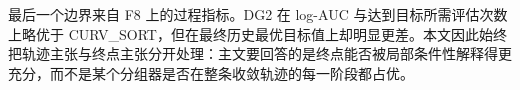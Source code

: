 最后一个边界来自 F8 上的过程指标。DG2 在 log-AUC 与达到目标所需评估次数上略优于 CURV\_SORT，但在最终历史最优目标值上却明显更差。本文因此始终把轨迹主张与终点主张分开处理：主文要回答的是终点能否被局部条件性解释得更充分，而不是某个分组器是否在整条收敛轨迹的每一阶段都占优。
